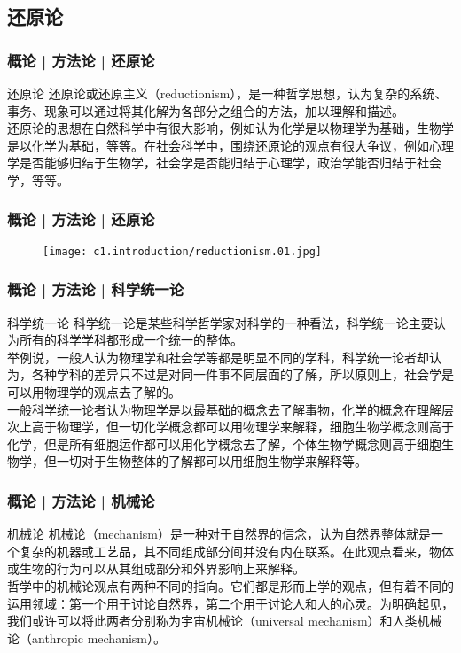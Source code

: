 \subsection{还原论}
\begin{frame}
  \frametitle{概论 | 方法论 | 还原论}
  \begin{block}{还原论}
还原论或还原主义（reductionism），是一种哲学思想，认为复杂的系统、事务、现象可以通过将其化解为各部分之组合的方法，加以理解和描述。\\
\vspace{1em}
还原论的思想在自然科学中有很大影响，例如认为化学是以物理学为基础，生物学是以化学为基础，等等。在社会科学中，围绕还原论的观点有很大争议，例如心理学是否能够归结于生物学，社会学是否能归结于心理学，政治学能否归结于社会学，等等。
  \end{block}
\end{frame}

\begin{frame}
  \frametitle{概论 | 方法论 | 还原论}
  \begin{figure}
    \centering
    \texttt{[image: c1.introduction/reductionism.01.jpg]}
  \end{figure}
\end{frame}

\begin{frame}
  \frametitle{概论 | 方法论 | 科学统一论}
  \begin{block}{科学统一论}
科学统一论是某些科学哲学家对科学的一种看法，科学统一论主要认为所有的科学学科都形成一个统一的整体。\\
\vspace{1em}
举例说，一般人认为物理学和社会学等都是明显不同的学科，科学统一论者却认为，各种学科的差异只不过是对同一件事不同层面的了解，所以原则上，社会学是可以用物理学的观点去了解的。\\
\vspace{1em}
一般科学统一论者认为物理学是以最基础的概念去了解事物，化学的概念在理解层次上高于物理学，但一切化学概念都可以用物理学来解释，细胞生物学概念则高于化学，但是所有细胞运作都可以用化学概念去了解，个体生物学概念则高于细胞生物学，但一切对于生物整体的了解都可以用细胞生物学来解释等。
  \end{block}
\end{frame}

\begin{frame}
  \frametitle{概论 | 方法论 | 机械论}
  \begin{block}{机械论}
机械论（mechanism）是一种对于自然界的信念，认为自然界整体就是一个复杂的机器或工艺品，其不同组成部分间并没有内在联系。在此观点看来，物体或生物的行为可以从其组成部分和外界影响上来解释。\\
\vspace{1em}
哲学中的机械论观点有两种不同的指向。它们都是形而上学的观点，但有着不同的运用领域：第一个用于讨论自然界，第二个用于讨论人和人的心灵。为明确起见，我们或许可以将此两者分别称为宇宙机械论（universal mechanism）和人类机械论（anthropic mechanism）。
  \end{block}
\end{frame}


